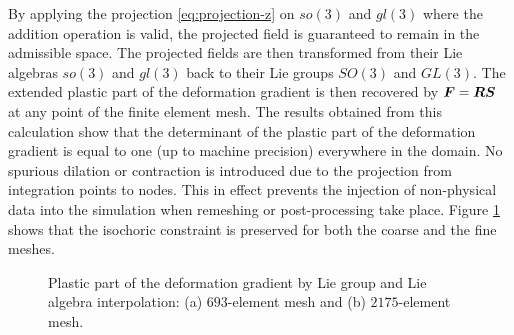 \documentclass[12pt]{article}
\newcommand{\mbs}[1]{\boldsymbol{#1}}
\def\bS{{\mbs{S}}} \def\bT{{\mbs{T}}} \def\bU{{\mbs{U}}}
\begin{document}
By applying the projection \eqref{eq:projection-z} on $so(3)$ and $gl(3)$ where
the addition operation is valid, the projected field is guaranteed to remain in
the admissible space. The projected fields are then transformed from their Lie
algebras $so(3)$ and $gl(3)$ back to their Lie groups $SO(3)$ and $GL(3)$. The
extended plastic part of the deformation gradient is then recovered by $\bF =
\bR \bS$ at any point of the finite element mesh. The results obtained from this
calculation show that the determinant of the plastic part of the deformation
gradient is equal to one (up to machine precision) everywhere in the domain. No
spurious dilation or contraction is introduced due to the projection from
integration points to nodes. This in effect prevents the injection of
non-physical data into the simulation when remeshing or post-processing take
place. Figure \ref{fig:billet-Lie} shows that the isochoric constraint is
preserved for both the coarse and the fine meshes.

\begin{figure}[htbp]
  \begin{center}
    \unitlength=1.0mm
    \caption{Plastic part of the deformation gradient by Lie group and Lie
    algebra interpolation: (a) $693$-element mesh and (b) $2175$-element mesh.}
    \label{fig:billet-Lie}
  \end{center}
\end{figure}
\end{document}
